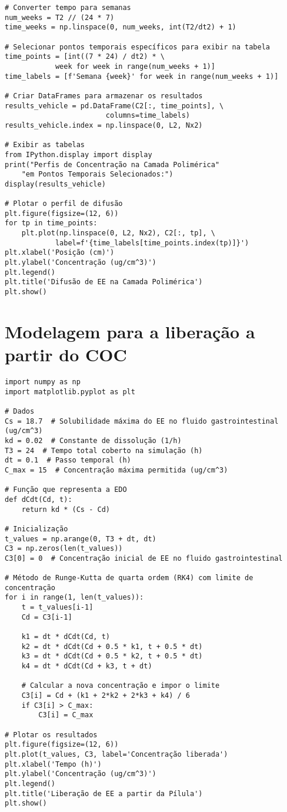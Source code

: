 \begin{verbatim}
# Converter tempo para semanas
num_weeks = T2 // (24 * 7)
time_weeks = np.linspace(0, num_weeks, int(T2/dt2) + 1)

# Selecionar pontos temporais específicos para exibir na tabela
time_points = [int((7 * 24) / dt2) * \
            week for week in range(num_weeks + 1)]
time_labels = [f'Semana {week}' for week in range(num_weeks + 1)]

# Criar DataFrames para armazenar os resultados
results_vehicle = pd.DataFrame(C2[:, time_points], \
                        columns=time_labels)
results_vehicle.index = np.linspace(0, L2, Nx2)

# Exibir as tabelas
from IPython.display import display
print("Perfis de Concentração na Camada Polimérica" 
    "em Pontos Temporais Selecionados:")
display(results_vehicle)

# Plotar o perfil de difusão
plt.figure(figsize=(12, 6))
for tp in time_points:
    plt.plot(np.linspace(0, L2, Nx2), C2[:, tp], \
            label=f'{time_labels[time_points.index(tp)]}')
plt.xlabel('Posição (cm)')
plt.ylabel('Concentração (ug/cm^3)')
plt.legend()
plt.title('Difusão de EE na Camada Polimérica')
plt.show()
\end{verbatim}

\section{Modelagem para a liberação a partir do COC}
\begin{verbatim}
import numpy as np
import matplotlib.pyplot as plt

# Dados
Cs = 18.7  # Solubilidade máxima do EE no fluido gastrointestinal (ug/cm^3)
kd = 0.02  # Constante de dissolução (1/h)
T3 = 24  # Tempo total coberto na simulação (h)
dt = 0.1  # Passo temporal (h)
C_max = 15  # Concentração máxima permitida (ug/cm^3)

# Função que representa a EDO
def dCdt(Cd, t):
    return kd * (Cs - Cd)

# Inicialização
t_values = np.arange(0, T3 + dt, dt)
C3 = np.zeros(len(t_values))
C3[0] = 0  # Concentração inicial de EE no fluido gastrointestinal

# Método de Runge-Kutta de quarta ordem (RK4) com limite de concentração
for i in range(1, len(t_values)):
    t = t_values[i-1]
    Cd = C3[i-1]

    k1 = dt * dCdt(Cd, t)
    k2 = dt * dCdt(Cd + 0.5 * k1, t + 0.5 * dt)
    k3 = dt * dCdt(Cd + 0.5 * k2, t + 0.5 * dt)
    k4 = dt * dCdt(Cd + k3, t + dt)

    # Calcular a nova concentração e impor o limite
    C3[i] = Cd + (k1 + 2*k2 + 2*k3 + k4) / 6
    if C3[i] > C_max:
        C3[i] = C_max

# Plotar os resultados
plt.figure(figsize=(12, 6))
plt.plot(t_values, C3, label='Concentração liberada')
plt.xlabel('Tempo (h)')
plt.ylabel('Concentração (ug/cm^3)')
plt.legend()
plt.title('Liberação de EE a partir da Pílula')
plt.show()
\end{verbatim}

